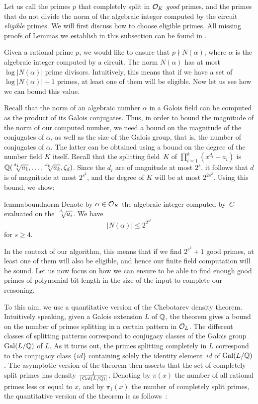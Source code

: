 Let us call the primes $p$ that completely split in $\mathcal{O}_K$
\emph{good} primes, and the primes that do not divide the norm of the algebraic integer computed by the circuit \emph{eligible} primes. We will first discuss how to choose eligible primes.
All missing proofs of Lemmas we establish in this subsection can be found in .


Given a rational prime $p$, we would like to ensure that $p \nmid N(\alpha)$, where $\alpha$ is the algebraic integer computed by a circuit.
The norm $N(\alpha)$ has at most $\log |N(\alpha)|$ prime divisors. Intuitively, this means that if we have a set of $\log |N(\alpha)| + 1$ primes, at least one of them will be eligible. Now let us see how we can bound this value.

Recall that the norm of an algebraic number $\alpha$ in a Galois field can be computed as the product of its Galois conjugates. Thus, in order to bound the magnitude of the norm of our computed number, we need a bound on the magnitude of the conjugates of $\alpha$, as well as the size of the Galois group, that is, the number of conjugates of $\alpha$. The latter can be obtained using a bound on the degree of the number field $K$ itself.
Recall that  the splitting field~$K$ of $\prod_{i=1}^k (x^{d_i}-a_i)$ is $\QQ(\mysqrt{d_1}{a_1}, \ldots, \mysqrt{d_k}{a_k},\zeta_d)$. Since the $d_i$ are of magnitude at most 
$2^s$, it follows that $d$ is of magnitude at most $2^{s^2}$,
and the degree of $K$ will be at most $2^{2s^2}$.
Using this bound, we show:

\begin{restatable}{lemma}{boundnorm}\label{lem:norm}
Denote by $\alpha\in \mathcal{O}_{K}$ the algebraic integer computed by~$C$ evaluated on the~$\mysqrt{d_i}{a_i}$. We have
\[ |N(\alpha)| \leq 2^{2^{s^3}} \]
for $s\geq 4$.

\end{restatable}

In the context of our algorithm, this means that if we find 
$2^{s^3} + 1$ good primes, at least one of them will also be eligible, and hence our finite field computation will be sound. Let us now focus on how we can ensure to be able to find enough good primes of polynomial bit-length in the size of the input to complete our reasoning.

To this aim, we use a quantitative version of the Chebotarev density theorem. Intuitively speaking, given a Galois extension $L$ of $\mathbb{Q}$, the theorem gives a bound on the number of primes splitting in a certain pattern in $\mathcal{O}_L$. The different classes of splitting patterns correspond to conjugacy classes of the Galois group $\operatorname{Gal}(L/\mathbb{Q})$ of $L$. As it turns out, the primes splitting completely in $L$ correspond to the conjugacy class $\{id\}$  
containing solely the identity element~$id$ of $\operatorname{Gal}(L/\mathbb{Q})$. The asymptotic version of the theorem then asserts that the set of completely split primes has density $\frac{1}{|\operatorname{Gal}(L/\mathbb{Q})|}$.  Denoting by $\pi(x)$ the number of all rational primes less or equal to $x$, and by $\pi_1(x)$ the number of completely split primes, the quantitative version of the theorem is as follows~\cite{lagariasO, serre1981quelques}:

